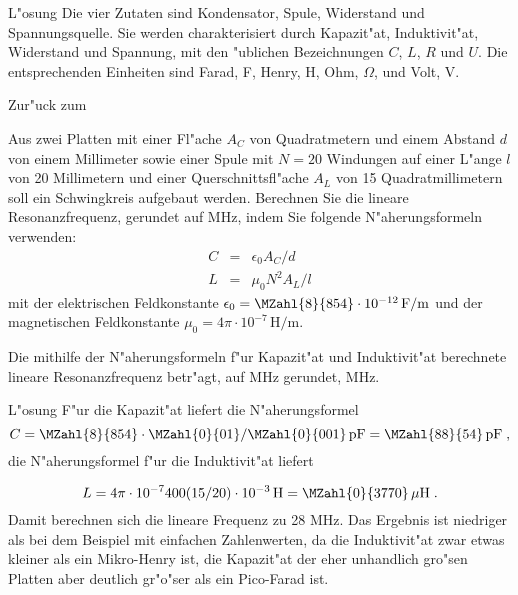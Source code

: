 \begin{MExercises}
\begin{MExercise}
\begin{MHint}{L"osung}
Die vier Zutaten sind Kondensator, Spule, Widerstand und Spannungsquelle. Sie werden charakterisiert durch Kapazit"at, Induktivit"at, Widerstand und Spannung, mit den "ublichen Bezeichnungen $C$, $L$, $R$ und $U$. Die entsprechenden Einheiten sind Farad, F, Henry, H, Ohm, $\Omega$, und Volt, V.
\end{MHint}

Zur"uck zum 
\end{MExercise}

\begin{MExercise}
Aus zwei Platten mit einer Fl"ache $A_C$ von  Quadratmetern und einem Abstand $d$ von einem Millimeter sowie einer Spule mit $N=20$ Windungen auf einer L"ange $l$ von 20 Millimetern und einer Querschnittsfl"ache $A_L$ von 15 Quadratmillimetern soll ein Schwingkreis aufgebaut werden. Berechnen Sie die lineare Resonanzfrequenz, gerundet auf MHz, indem Sie folgende N"aherungsformeln verwenden:
\begin{eqnarray}
  C &=& \epsilon_0 A_C / d\\
  L &=& \mu_0 N^2 A_L / l
\end{eqnarray}
mit der elektrischen Feldkonstante $\epsilon_0 = \MZahl{8}{854}\cdot 10^{-12}\,\text{F/m}$ und der magnetischen Feldkonstante $\mu_0 = 4\pi\cdot 10^{-7}\,\text{H/m}$. 

Die mithilfe der N"aherungsformeln f"ur Kapazit"at und Induktivit"at berechnete lineare Resonanzfrequenz betr"agt, auf MHz gerundet,  MHz.

\begin{MHint}{L"osung} 
F"ur die Kapazit"at liefert die N"aherungsformel
\begin{equation}
  C=\MZahl{8}{854}\cdot \MZahl{0}{01} / \MZahl{0}{001} \,\text{pF} = \MZahl{88}{54} \,\text{pF}\; ,
\end{equation}
die N"aherungsformel f"ur die Induktivit"at liefert

\begin{equation}
  L=4\pi\cdot 10^{-7} 400 (15/20)\cdot 10^{-3} \,\text{H} = \MZahl{0}{3770}\,\mu\text{H}\; .
\end{equation}
Damit berechnen sich die lineare Frequenz zu 28 MHz. Das Ergebnis ist niedriger als bei dem Beispiel mit einfachen Zahlenwerten, da die Induktivit"at zwar etwas kleiner als ein Mikro-Henry ist, die Kapazit"at der eher unhandlich gro"sen Platten aber deutlich gr"o"ser als ein Pico-Farad ist.


\end{MHint}
\end{MExercise}
\end{MExercises}
